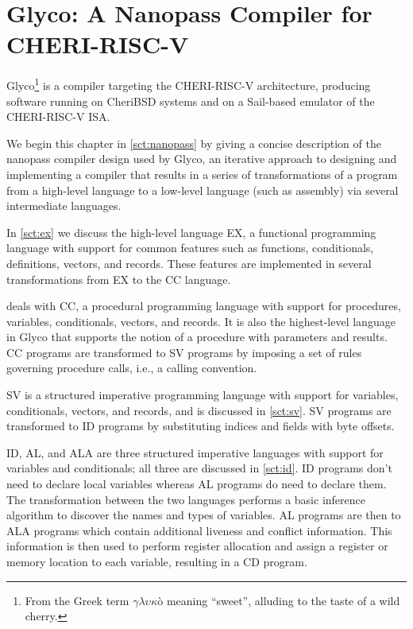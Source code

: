 \documentclass[main.tex]{subfiles}
\begin{document}
\onlyinsubfile{\mainmatter{}}

\chapter{Glyco: A Nanopass Compiler for CHERI-RISC-V} \label{ch:glyco}
Glyco\footnote{From the Greek term $\gamma\lambda\upsilon\kappa{}\text{ò}$ meaning \enquote{sweet}, alluding to the taste of a wild cherry.} is a compiler targeting the CHERI-RISC-V architecture, producing software running on CheriBSD systems and on a Sail-based emulator of the CHERI-RISC-V ISA.

We begin this chapter in \cref{sct:nanopass} by giving a concise description of the nanopass compiler design used by Glyco, an iterative approach to designing and implementing a compiler that results in a series of transformations of a program from a high-level language to a low-level language (such as assembly) via several intermediate languages.

In \cref{sct:ex} we discuss the high-level language EX, a functional programming language with support for common features such as functions, conditionals, definitions, vectors, and records. These features are implemented in several transformations from EX to the CC language.

 deals with CC, a procedural programming language with support for procedures, variables, conditionals, vectors, and records. It is also the highest-level language in Glyco that supports the notion of a procedure with parameters and results. CC programs are transformed to SV programs by imposing a set of rules governing procedure calls, i.e., a calling convention.

SV is a structured imperative programming language with support for variables, conditionals, vectors, and records, and is discussed in \cref{sct:sv}. SV programs are transformed to ID programs by substituting indices and fields with byte offsets.

ID, AL, and ALA are three structured imperative languages with support for variables and conditionals; all three are discussed in \cref{sct:id}. ID programs don't need to declare local variables whereas AL programs do need to declare them. The transformation between the two languages performs a basic inference algorithm to discover the names and types of variables. AL programs are then \lowered{} to ALA programs which contain additional liveness and conflict information. This information is then used to perform register allocation and assign a register or memory location to each variable, resulting in a CD program.
\end{document}
